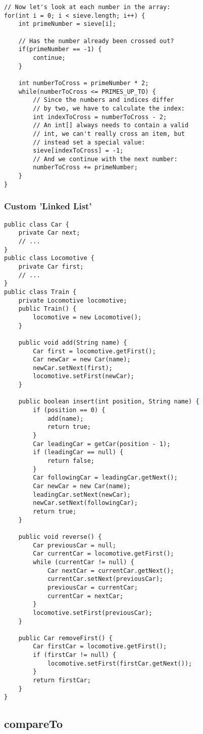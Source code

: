\begin{multicols*}{5}
\begin{lstlisting}
// Now let's look at each number in the array:
for(int i = 0; i < sieve.length; i++) {
	int primeNumber = sieve[i];
	
	// Has the number already been crossed out?
	if(primeNumber == -1) {
		continue;
	}
	
	int numberToCross = primeNumber * 2;
	while(numberToCross <= PRIMES_UP_TO) {
		// Since the numbers and indices differ
		// by two, we have to calculate the index:
		int indexToCross = numberToCross - 2;
		// An int[] always needs to contain a valid
		// int, we can't really cross an item, but
		// instead set a special value:
		sieve[indexToCross] = -1;
		// And we continue with the next number:
		numberToCross += primeNumber;
	}
}
		\end{lstlisting}
	
	
	\subsubsection{Custom 'Linked List'}
	\begin{lstlisting}
public class Car {
	private Car next;
	// ...
}
public class Locomotive {
	private Car first;
	// ...
}
public class Train {
	private Locomotive locomotive;
	public Train() {
		locomotive = new Locomotive();
	}
	
	public void add(String name) {
		Car first = locomotive.getFirst();
		Car newCar = new Car(name);
		newCar.setNext(first);
		locomotive.setFirst(newCar);
	}
	
	public boolean insert(int position, String name) {
		if (position == 0) {
			add(name);
			return true;
		}
		Car leadingCar = getCar(position - 1);
		if (leadingCar == null) {
			return false;
		}
		Car followingCar = leadingCar.getNext();
		Car newCar = new Car(name);
		leadingCar.setNext(newCar);
		newCar.setNext(followingCar);
		return true;
	}
	
	public void reverse() {
		Car previousCar = null;
		Car currentCar = locomotive.getFirst();
		while (currentCar != null) {
			Car nextCar = currentCar.getNext();
			currentCar.setNext(previousCar);
			previousCar = currentCar;
			currentCar = nextCar;
		}
		locomotive.setFirst(previousCar);
	}
	
	public Car removeFirst() {
		Car firstCar = locomotive.getFirst();
		if (firstCar != null) {
			locomotive.setFirst(firstCar.getNext());
		}
		return firstCar;
	}
}
	\end{lstlisting}
	
	\subsection{compareTo}
	

\end{multicols*}
